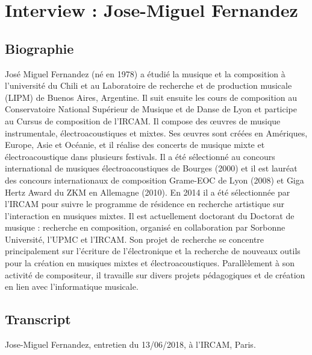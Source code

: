 \chapter{Interview : Jose-Miguel Fernandez}
\label{appendix:fernandez}

\section*{Biographie}

\noindent José Miguel Fernandez (né en 1978) a étudié la musique et la composition à l’université du Chili et au Laboratoire de recherche et de production musicale (LIPM) de Buenos Aires, Argentine. Il suit ensuite les cours de composition au Conservatoire National Supérieur de Musique et de Danse de Lyon et participe au Cursus de composition de l’IRCAM. Il compose des œuvres de musique instrumentale, électroacoustiques et mixtes. Ses œuvres sont créées en Amériques, Europe, Asie et Océanie, et il réalise des concerts de musique mixte et électroacoustique dans plusieurs festivals. Il a été sélectionné au concours international de musiques électroacoustiques de Bourges (2000) et il est lauréat des concours internationaux de composition Grame-EOC de Lyon (2008) et Giga Hertz Award du ZKM en Allemagne (2010). En 2014 il a été sélectionnée par l'IRCAM pour suivre le programme de résidence en recherche artistique sur l'interaction en musiques mixtes. Il est actuellement doctorant du Doctorat de musique : recherche en composition, organisé en collaboration par Sorbonne Université, l’UPMC et l'IRCAM. Son projet de recherche se concentre principalement sur l’écriture de l’électronique et la recherche de nouveaux outils pour la création en musiques mixtes et électroacoustiques. Parallèlement à son activité de compositeur, il travaille sur divers projets pédagogiques et de création en lien avec l’informatique musicale.

\section*{Transcript}

\noindent Jose-Miguel Fernandez, entretien du 13/06/2018, à l'IRCAM, Paris.




